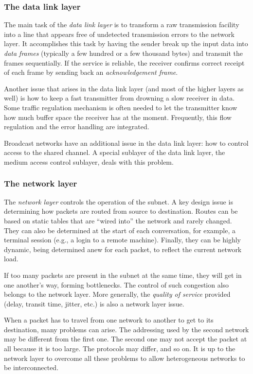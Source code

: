 \subsubsection{The data link layer}

The main task of the \emph{data link layer} is to transform a raw transmission facility into a line that appears free of undetected
transmission errors to the network layer.
It accomplishes this task by having the sender break up the input data into \emph{data frames} (typically a few hundred or a few thousand bytes) and transmit the frames sequentially.
If the service is reliable, the receiver confirms correct receipt of each frame by sending back an \emph{acknowledgement frame}.

Another issue that arises in the data link layer (and most of the higher layers as well) is how to keep a fast transmitter from drowning a slow receiver in data.
Some traffic regulation mechanism is often needed to let the transmitter know how much buffer space the receiver has at the moment.
Frequently, this flow regulation and the error handling are integrated.

Broadcast networks have an additional issue in the data link layer: how to control access to the shared channel.
A special sublayer of the data link layer, the medium access control sublayer, deals with this problem.


\subsubsection{The network layer}

The \emph{network layer} controls the operation of the subnet.
A key design issue is determining how packets are routed from source to destination.
Routes can be based on static tables that are ``wired into'' the network and rarely changed.
They can also be determined at the start of each conversation, for example, a terminal session (e.g., a login to a remote
machine). Finally, they can be highly dynamic, being determined anew for
each packet, to reflect the current network load.

If too many packets are present in the subnet at the same time, they
will get in one another's way, forming bottlenecks. The control of such
congestion also belongs to the network layer. More generally, the
\emph{quality of service} provided (delay, transit time, jitter, etc.) is also a network layer issue.

When a packet has to travel from one network to another to get to its
destination, many problems can arise. The addressing used by the second
network may be different from the first one. The second one may not
accept the packet at all because it is too large. The protocols may
differ, and so on. It is up to the network layer to overcome all these
problems to allow heterogeneous networks to be interconnected.


